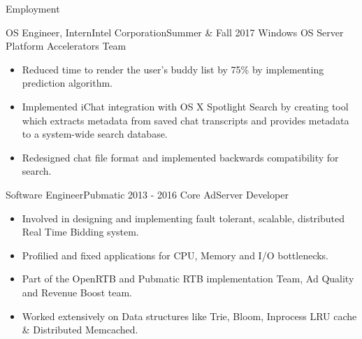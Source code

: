 \documentclass[]{mcdowellcv}
\begin{document}
	\makeheader
	
	\begin{cvsection}{Employment}
		\begin{cvsubsection}{OS Engineer, Intern}{Intel Corporation}{Summer \& Fall 2017}
			Windows OS Server Platform Accelerators Team			
			\begin{itemize}
				\item Reduced time to render the user’s buddy list by 75\% by implementing prediction algorithm.
				\item Implemented iChat integration with OS X Spotlight Search by creating tool which extracts metadata from saved chat transcripts and provides metadata to a system-wide search database.
				\item Redesigned chat file format and implemented backwards compatibility for search.
			\end{itemize}
		\end{cvsubsection}
		
		\begin{cvsubsection}{Software Engineer}{Pubmatic }{2013 - 2016}	
			Core AdServer Developer
			\begin{itemize}
			\item Involved in designing and implementing fault tolerant, scalable, distributed Real Time Bidding system.
			\item  Profilied and fixed applications for CPU, Memory and I/O bottlenecks.
			\item Part of the OpenRTB and Pubmatic RTB implementation Team, Ad Quality and Revenue Boost team.
			\item Worked extensively on Data structures like Trie, Bloom, Inprocess LRU cache \& Distributed Memcached.
			\end{itemize}
		\end{cvsubsection}
		
		\end{cvsection}
	
\end{document}
